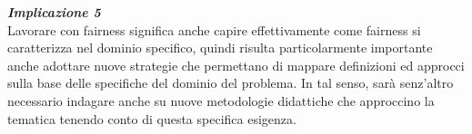 	
	 
	
	
	
	\begin{center}
	
        \begin{tcolorbox}[width=\textwidth, colframe=black, colback=perla]
    			\begin{minipage}{\textwidth}
    				\textit{\faCaretSquareORight  \textbf{ Implicazione 5}}\\
    		    Lavorare con fairness significa anche capire effettivamente come fairness si caratterizza nel dominio specifico, quindi risulta particolarmente importante anche adottare nuove strategie che permettano di mappare definizioni ed approcci sulla base delle specifiche del dominio del problema. In tal senso, sarà senz'altro necessario indagare anche su nuove metodologie didattiche che approccino la tematica tenendo conto di questa specifica esigenza.
    			\end{minipage}
		\end{tcolorbox}
	\end{center}
\newpage
